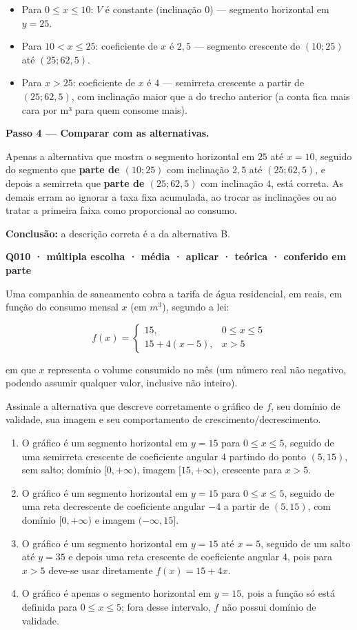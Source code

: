 \documentclass[11pt,a4paper]{article}
\begin{document}
\begin{itemize}[nosep,leftmargin=*]
\item Para $0\le x\le10$: $V$ é constante (inclinação $0$) — segmento horizontal em $y=25$.
\item Para $10<x\le25$: coeficiente de $x$ é $2{,}5$ — segmento crescente de $(10;25)$ até $(25;62{,}5)$.
\item Para $x>25$: coeficiente de $x$ é $4$ — semirreta crescente a partir de $(25;62{,}5)$, com inclinação maior que a do trecho anterior (a conta fica mais cara por m³ para quem consome mais).
\end{itemize}

\textbf{Passo 4 — Comparar com as alternativas.}

Apenas a alternativa que mostra o segmento horizontal em $25$ até $x=10$, seguido do segmento que \textbf{parte de $(10;25)$} com inclinação $2{,}5$ até $(25;62{,}5)$, e depois a semirreta que \textbf{parte de $(25;62{,}5)$} com inclinação $4$, está correta. As demais erram ao ignorar a taxa fixa acumulada, ao trocar as inclinações ou ao tratar a primeira faixa como proporcional ao consumo.

\textbf{Conclusão:} a descrição correta é a da alternativa B.

\bigskip\noindent\textbf{Q010 · múltipla escolha · média · aplicar · teórica · conferido em parte}\par\nopagebreak
Uma companhia de saneamento cobra a tarifa de água residencial, em reais, em função do consumo mensal $x$ (em $m^3$), segundo a lei:

$$f(x) = \begin{cases} 15, & 0 \le x \le 5 \\ 15 + 4(x-5), & x > 5 \end{cases}$$

em que $x$ representa o volume consumido no mês (um número real não negativo, podendo assumir qualquer valor, inclusive não inteiro).

Assinale a alternativa que descreve corretamente o gráfico de $f$, seu domínio de validade, sua imagem e seu comportamento de crescimento/decrescimento.
\begin{enumerate}[label=(\alph*)]
\item O gráfico é um segmento horizontal em $y=15$ para $0\le x\le 5$, seguido de uma semirreta crescente de coeficiente angular $4$ partindo do ponto $(5,15)$, sem salto; domínio $[0,+\infty)$, imagem $[15,+\infty)$, crescente para $x>5$.
\item O gráfico é um segmento horizontal em $y=15$ para $0\le x\le 5$, seguido de uma reta decrescente de coeficiente angular $-4$ a partir de $(5,15)$, com domínio $[0,+\infty)$ e imagem $(-\infty,15]$.
\item O gráfico é um segmento horizontal em $y=15$ até $x=5$, seguido de um salto até $y=35$ e depois uma reta crescente de coeficiente angular $4$, pois para $x>5$ deve-se usar diretamente $f(x)=15+4x$.
\item O gráfico é apenas o segmento horizontal em $y=15$, pois a função só está definida para $0\le x\le 5$; fora desse intervalo, $f$ não possui domínio de validade.
\end{enumerate}
\end{document}
